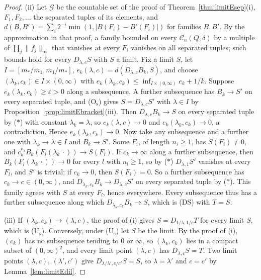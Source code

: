 \documentclass[aps,prd,twocolumn,superscriptaddress,nofootinbib,longbibliography,floatfix,amsmath,amssymb,10pt]{revtex4-2}
\theoremstyle{definition}
\theoremstyle{remark}
\begin{document}
\begin{proof}
(ii) Let $\mathcal G$ be the countable set of the proof of
Theorem~\ref{thm:limitEsep}(i), $F_1,F_2,\dots$ the separated tuples of its
elements, and $d(B,B')=\sum_i2^{-i}\min(1,|B(F_i)-B'(F_i)|)$ for families
$B,B'$. By the approximation in that proof, a family bounded on every
$\mathcal C_n(Q,\delta)$ by a multiple of $\prod_j\|f_j\|_\infty$ that
vanishes at every $F_i$ vanishes on all separated tuples; such bounds hold
for every $D_{\lambda,c}S$ with $S$ a limit. Fix a limit $S$, let $I=[m_*/
m_1,m_1/m_*]$, $e_k(\lambda,c)=d(D_{\lambda,c}B_k,S)$, and choose
$(\lambda_k,c_k)\in I\times(0,\infty)$ with $e_k(\lambda_k,c_k)\le
\inf_{I\times(0,\infty)}e_k+1/k$. Suppose $e_k(\lambda_k,c_k)\ge\varepsilon>0$
along a subsequence. A further subsequence has $B_k\to S'$ on every
separated tuple, and (O$_{\mathrm s}$) gives $S=D_{\lambda,c}S'$ with
$\lambda\in I$ by Proposition~\ref{prop:limitEbracket}(iii). Then
$D_{\lambda,c}B_k\to S$ on every separated tuple by ($*$) with constant
$\lambda_k=\lambda$, so $e_k(\lambda,c)\to0$ and $e_k(\lambda_k,c_k)\to0$, a
contradiction. Hence $e_k(\lambda_k,c_k)\to0$. Now take any subsequence and
a further one with $\lambda_k\to\lambda\in I$ and $B_k\to S'$. Some $F_i$,
of length $n_i\ge1$, has $S(F_i)\ne0$, and $c_k^{n_i}B_k(F_i(\lambda_k\,
\cdot))\to S(F_i)$. If $c_k\to\infty$ along a further subsequence, then
$B_k(F_l(\lambda_k\,\cdot))\to0$ for every $l$ with $n_l\ge1$, so by ($*$)
$D_{\lambda,1}S'$ vanishes at every $F_l$, and $S'$ is trivial; if $c_k\to0$,
then $S(F_i)=0$. So a further subsequence has $c_k\to c\in(0,\infty)$, and
$D_{\lambda_k,c_k}B_k\to D_{\lambda,c}S'$ on every separated tuple by ($*$).
This family agrees with $S$ at every $F_l$, hence everywhere. Every
subsequence thus has a further subsequence along which $D_{\lambda_k,c_k}
B_k\to S$, which is (DS) with $T=S$.

(iii) If $(\lambda_k,c_k)\to(\lambda,c)$, the proof of (i) gives $S=
D_{1/\lambda,1/c}T$ for every limit $S$, which is (U$_{\mathrm s}$).
Conversely, under (U$_{\mathrm s}$) let $S$ be the limit. By the proof of
(i), $(c_k)$ has no subsequence tending to $0$ or $\infty$, so
$(\lambda_k,c_k)$ lies in a compact subset of $(0,\infty)^2$, and every
limit point $(\lambda,c)$ has $D_{\lambda,c}S=T$. Two limit points
$(\lambda,c)$, $(\lambda',c')$ give $D_{\lambda/\lambda',c/c'}S=S$, so
$\lambda=\lambda'$ and $c=c'$ by Lemma~\ref{lem:limitEdil}.
\end{proof}
\end{document}
